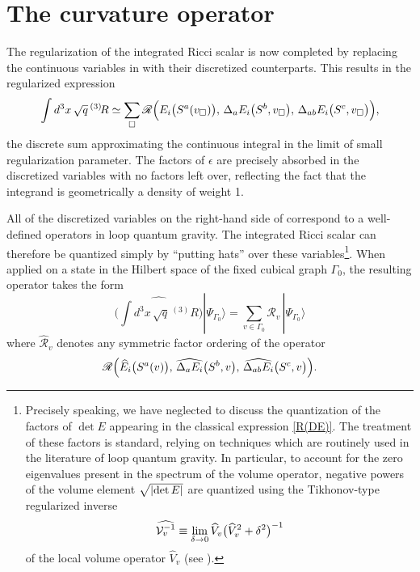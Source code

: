 \documentclass{appolb_edited}
\newcommand{\ket}[1]{|#1\rangle}
\newcommand{\R}{{\mathscr R}}
\newcommand{\Rt}{\,{}^{(3)}\!R}
\newcommand{\de}{{\rm det}\,E}
\newcommand{\Gc}{{\Gamma_{\! 0}}}
\begin{document}
\section{The curvature operator}

The regularization of the integrated Ricci scalar is now completed by replacing the continuous variables in  with their discretized counterparts. This results in the regularized expression
\begin{equation}
	\int d^3x\,\sqrt q\Rt \simeq \sum_{\Box} \R\Bigl(E_i\bigl(S^a(v_\Box)\bigr), \, \Delta_aE_i\bigl(S^b, v_\Box\bigr), \, \Delta_{ab}E_i\bigl(S^c, v_\Box\bigr)\Bigr),
	\label{regularized}
\end{equation}
the discrete sum approximating the continuous integral in the limit of small regularization parameter. The factors of $\epsilon$ are precisely absorbed in the discretized variables with no factors left over, reflecting the fact that the integrand is geometrically a density of weight 1.

All of the discretized variables on the right-hand side of  correspond to a well-defined operators in loop quantum gravity. The integrated Ricci scalar can therefore be quantized simply by ``putting hats'' over these variables\footnote{
	Precisely speaking, we have neglected to discuss the quantization of the factors of $\det E$ appearing in the classical expression \eqref{R(DE)}. The treatment of these factors is standard, relying on techniques which are routinely used in the literature of loop quantum gravity. In particular, to account for the zero eigenvalues present in the spectrum of the volume operator, negative powers of the volume element $\sqrt{|\de|}$ are quantized using the Tikhonov-type regularized inverse
\[
	\widehat{{\cal V}_v^{-1}} \equiv \lim_{\delta\to 0} \widehat V_v\bigl(\widehat V_v^2 + \delta^2\bigr)^{-1}
\]
of the local volume operator $\widehat V_v$ (see \eg \cite{Bianchi:2008es}).
}.
When applied on a state in the Hilbert space of the fixed cubical graph $\Gamma_0$, the resulting operator takes the form
\begin{equation}
	\biggl(\widehat{\displaystyle\int d^3x\,\sqrt q\Rt}\biggr)\ket{\Psi_\Gc} = \sum_{v\in{\Gc}} \widehat{\R}_v\,\ket{\Psi_\Gc}
	\label{}
\end{equation}
where $\widehat\R_v$ denotes any symmetric factor ordering of the operator
\begin{equation}
	\R\Bigl(\widehat E_i\bigl(S^a(v)\bigr), \, \widehat{\Delta_aE_i}\bigl(S^b, v\bigr), \, \widehat{\Delta_{ab}E_i}\bigl(S^c, v\bigr)\Bigr).
	\label{}
\end{equation}
\end{document}
